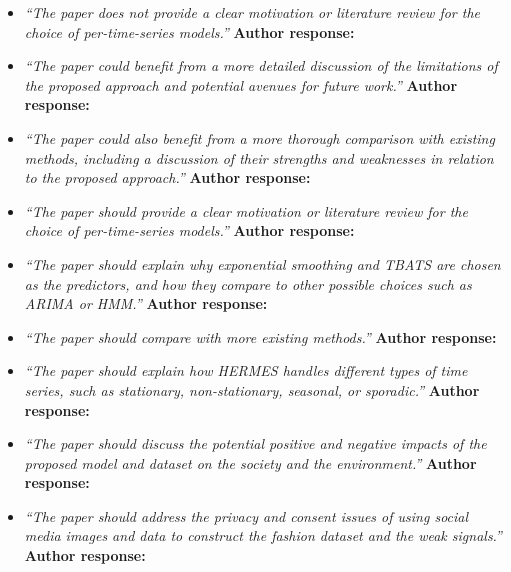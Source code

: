 \documentclass[10pt]{article} %
\begin{document}
\begin{itemize}
	\item {\em ``The paper does not provide a clear motivation or literature review for the choice of per-time-series models.''} \medskip
	\textbf{Author response:} \\
	
	\item {\em ``The paper could benefit from a more detailed discussion of the limitations of the proposed approach and potential avenues for future work.''} \medskip
	\textbf{Author response:} \\
	
	\item {\em ``The paper could also benefit from a more thorough comparison with existing methods, including a discussion of their strengths and weaknesses in relation to the proposed approach.''} \medskip
	\textbf{Author response:} \\
	
	\item {\em ``The paper should provide a clear motivation or literature review for the choice of per-time-series models.''} \medskip
	\textbf{Author response:} \\
	
	\item {\em ``The paper should explain why exponential smoothing and TBATS are chosen as the predictors, and how they compare to other possible choices such as ARIMA or HMM.''} \medskip
	\textbf{Author response:} \\
	
	\item {\em ``The paper should compare with more existing methods.''} \medskip
	\textbf{Author response:} \\
	
	\item {\em ``The paper should explain how HERMES handles different types of time series, such as stationary, non-stationary, seasonal, or sporadic.''} \medskip
	\textbf{Author response:} \\
	
	\item {\em ``The paper should discuss the potential positive and negative impacts of the proposed model and dataset on the society and the environment.''} \medskip
	\textbf{Author response:} \\
	
	\item {\em ``The paper should address the privacy and consent issues of using social media images and data to construct the fashion dataset and the weak signals.''} \medskip
	\textbf{Author response:} \\
	

\end{itemize}
\end{document}
